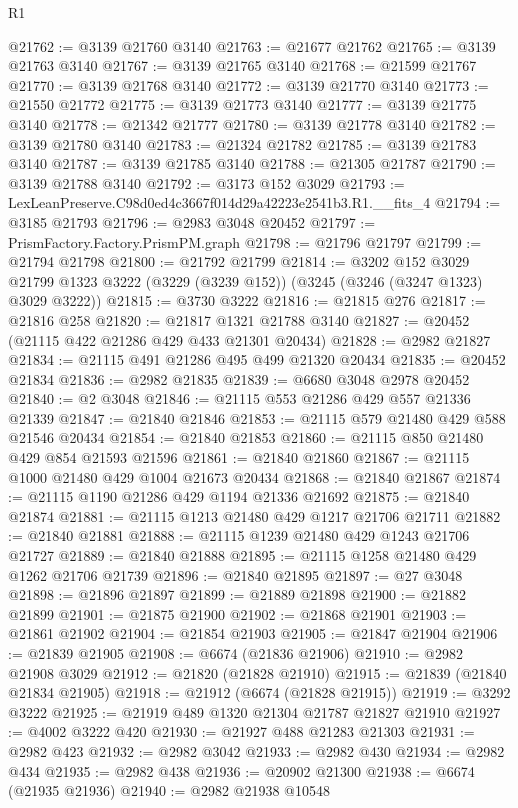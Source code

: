\begin{lexlean}{R1}
\begin{coremodule}
@21762 := @3139 @21760 @3140
@21763 := @21677 @21762
@21765 := @3139 @21763 @3140
@21767 := @3139 @21765 @3140
@21768 := @21599 @21767
@21770 := @3139 @21768 @3140
@21772 := @3139 @21770 @3140
@21773 := @21550 @21772
@21775 := @3139 @21773 @3140
@21777 := @3139 @21775 @3140
@21778 := @21342 @21777
@21780 := @3139 @21778 @3140
@21782 := @3139 @21780 @3140
@21783 := @21324 @21782
@21785 := @3139 @21783 @3140
@21787 := @3139 @21785 @3140
@21788 := @21305 @21787
@21790 := @3139 @21788 @3140
@21792 := @3173 @152 @3029
@21793 := LexLeanPreserve.C98d0ed4c3667f014d29a42223e2541b3.R1.__fits_4
@21794 := @3185 @21793
@21796 := @2983 @3048 @20452
@21797 := PrismFactory.Factory.PrismPM.graph
@21798 := @21796 @21797
@21799 := @21794 @21798
@21800 := @21792 @21799
@21814 := @3202
    @152
    @3029
    @21799
    @1323
    @3222
    (@3229 (@3239 @152))
    (@3245 (@3246 (@3247 @1323) @3029 @3222))
@21815 := @3730 @3222
@21816 := @21815 @276
@21817 := @21816 @258
@21820 := @21817 @1321 @21788 @3140
@21827 := @20452 (@21115 @422 @21286 @429 @433 @21301 @20434)
@21828 := @2982 @21827
@21834 := @21115 @491 @21286 @495 @499 @21320 @20434
@21835 := @20452 @21834
@21836 := @2982 @21835
@21839 := @6680 @3048 @2978 @20452
@21840 := @2 @3048
@21846 := @21115 @553 @21286 @429 @557 @21336 @21339
@21847 := @21840 @21846
@21853 := @21115 @579 @21480 @429 @588 @21546 @20434
@21854 := @21840 @21853
@21860 := @21115 @850 @21480 @429 @854 @21593 @21596
@21861 := @21840 @21860
@21867 := @21115 @1000 @21480 @429 @1004 @21673 @20434
@21868 := @21840 @21867
@21874 := @21115 @1190 @21286 @429 @1194 @21336 @21692
@21875 := @21840 @21874
@21881 := @21115 @1213 @21480 @429 @1217 @21706 @21711
@21882 := @21840 @21881
@21888 := @21115 @1239 @21480 @429 @1243 @21706 @21727
@21889 := @21840 @21888
@21895 := @21115 @1258 @21480 @429 @1262 @21706 @21739
@21896 := @21840 @21895
@21897 := @27 @3048
@21898 := @21896 @21897
@21899 := @21889 @21898
@21900 := @21882 @21899
@21901 := @21875 @21900
@21902 := @21868 @21901
@21903 := @21861 @21902
@21904 := @21854 @21903
@21905 := @21847 @21904
@21906 := @21839 @21905
@21908 := @6674 (@21836 @21906)
@21910 := @2982 @21908 @3029
@21912 := @21820 (@21828 @21910)
@21915 := @21839 (@21840 @21834 @21905)
@21918 := @21912 (@6674 (@21828 @21915))
@21919 := @3292 @3222
@21925 := @21919 @489 @1320 @21304 @21787 @21827 @21910
@21927 := @4002 @3222 @420
@21930 := @21927 @488 @21283 @21303
@21931 := @2982 @423
@21932 := @2982 @3042
@21933 := @2982 @430
@21934 := @2982 @434
@21935 := @2982 @438
@21936 := @20902 @21300
@21938 := @6674 (@21935 @21936)
@21940 := @2982 @21938 @10548

\end{coremodule}
\end{lexlean}
